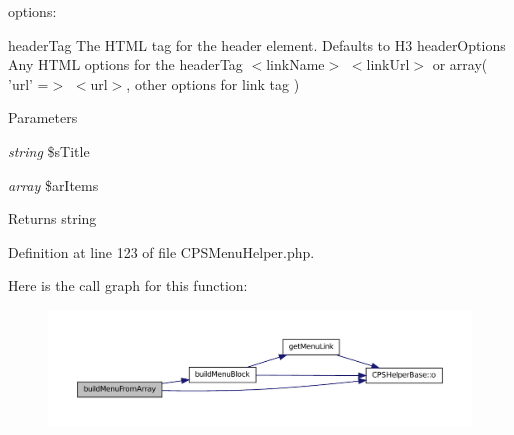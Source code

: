 options:

headerTag The HTML tag for the header element. Defaults to H3 headerOptions Any HTML options for the headerTag $<$linkName$>$ $<$linkUrl$>$ or array( 'url' =$>$ $<$url$>$, other options for link tag )


\begin{DoxyParams}{Parameters}
\item[{\em string}]\$sTitle \item[{\em array}]\$arItems \end{DoxyParams}
\begin{DoxyReturn}{Returns}
string 
\end{DoxyReturn}


Definition at line 123 of file CPSMenuHelper.php.








Here is the call graph for this function:\nopagebreak
\begin{figure}[H]
\begin{center}
\leavevmode
\includegraphics[width=400pt]{classCPSMenuHelper_a5c720cd125d4437d4ed589278a75046c_cgraph}
\end{center}
\end{figure}


